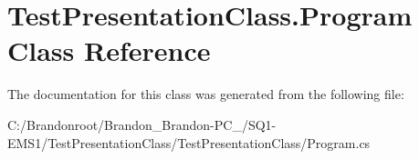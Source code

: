 \hypertarget{class_test_presentation_class_1_1_program}{}\section{Test\+Presentation\+Class.\+Program Class Reference}
\label{class_test_presentation_class_1_1_program}


The documentation for this class was generated from the following file\+:\begin{DoxyCompactItemize}
\item 
C\+:/\+Brandonroot/\+Brandon\+\_\+\+Brandon-\/\+P\+C\+\_/\+S\+Q1-\/\+E\+M\+S1/\+Test\+Presentation\+Class/\+Test\+Presentation\+Class/Program.\+cs\end{DoxyCompactItemize}
